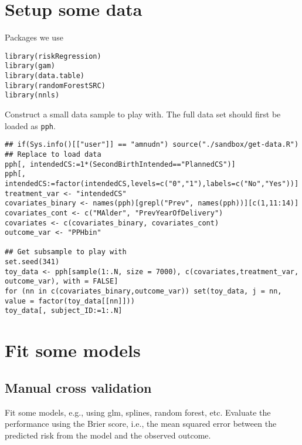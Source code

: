 \documentclass[a4paper,danish]{article}
\author{Anders Munch}
\date{\today}
\title{}
\begin{document}
\section{Setup some data}
\label{sec:orgda61a24}
Packages we use
\lstset{language=r,label= ,caption= ,captionpos=b,numbers=none}
\begin{lstlisting}
library(riskRegression)
library(gam)
library(data.table)
library(randomForestSRC)
library(nnls)
\end{lstlisting}

Construct a small data sample to play with. The full data set should first be loaded as \texttt{pph}.

\lstset{language=r,label= ,caption= ,captionpos=b,numbers=none}
\begin{lstlisting}
## if(Sys.info()[["user"]] == "amnudn") source("./sandbox/get-data.R") ## Replace to load data
pph[, intendedCS:=1*(SecondBirthIntended=="PlannedCS")]
pph[, intendedCS:=factor(intendedCS,levels=c("0","1"),labels=c("No","Yes"))]
treatment_var <- "intendedCS"
covariates_binary <- names(pph)[grepl("Prev", names(pph))][c(1,11:14)]
covariates_cont <- c("MAlder", "PrevYearOfDelivery")
covariates <- c(covariates_binary, covariates_cont)
outcome_var <- "PPHbin"

## Get subsample to play with
set.seed(341)
toy_data <- pph[sample(1:.N, size = 7000), c(covariates,treatment_var, outcome_var), with = FALSE]
for (nn in c(covariates_binary,outcome_var)) set(toy_data, j = nn, value = factor(toy_data[[nn]]))
toy_data[, subject_ID:=1:.N]
\end{lstlisting}

\section{Fit some models}
\label{sec:org3d91659}

\subsection{Manual cross validation}
\label{sec:org7a3f78b}
Fit some models, e.g., using glm, splines, random forest, etc. Evaluate the performance using the
Brier score, i.e., the mean squared error between the predicted risk from the model and the observed
outcome.
\end{document}
